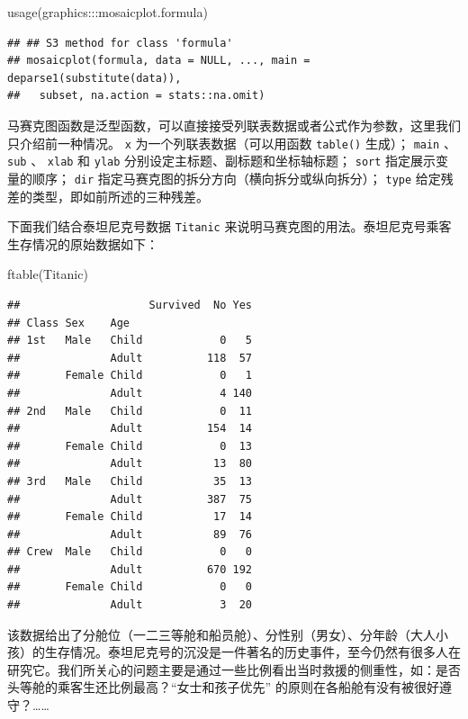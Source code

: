 \documentclass[
  b5paper,
  UTF8,twoside]{book}
\newenvironment{Shaded}{\begin{snugshade}}{\end{snugshade}}
\newcommand{\FunctionTok}[1]{\textcolor[rgb]{0.00,0.00,0.00}{#1}}
\newcommand{\NormalTok}[1]{#1}
\newcommand{\SpecialCharTok}[1]{\textcolor[rgb]{0.00,0.00,0.00}{#1}}
\begin{document}
\begin{Shaded}
\begin{Highlighting}[]
\FunctionTok{usage}\NormalTok{(graphics}\SpecialCharTok{:::}\NormalTok{mosaicplot.formula)}
\end{Highlighting}
\end{Shaded}

\begin{verbatim}
## ## S3 method for class 'formula'
## mosaicplot(formula, data = NULL, ..., main = deparse1(substitute(data)),
##   subset, na.action = stats::na.omit)
\end{verbatim}

马赛克图函数是泛型函数，可以直接接受列联表数据或者公式作为参数，这里我们只介绍前一种情况。 \texttt{x} 为一个列联表数据（可以用函数 \texttt{table()} 生成）； \texttt{main} 、 \texttt{sub} 、 \texttt{xlab} 和 \texttt{ylab} 分别设定主标题、副标题和坐标轴标题； \texttt{sort} 指定展示变量的顺序； \texttt{dir} 指定马赛克图的拆分方向（横向拆分或纵向拆分）； \texttt{type} 给定残差的类型，即如前所述的三种残差。

下面我们结合泰坦尼克号数据 \texttt{Titanic} 来说明马赛克图的用法。泰坦尼克号乘客生存情况的原始数据如下：

\begin{Shaded}
\begin{Highlighting}[]
\FunctionTok{ftable}\NormalTok{(Titanic)}
\end{Highlighting}
\end{Shaded}

\begin{verbatim}
##                    Survived  No Yes
## Class Sex    Age                   
## 1st   Male   Child            0   5
##              Adult          118  57
##       Female Child            0   1
##              Adult            4 140
## 2nd   Male   Child            0  11
##              Adult          154  14
##       Female Child            0  13
##              Adult           13  80
## 3rd   Male   Child           35  13
##              Adult          387  75
##       Female Child           17  14
##              Adult           89  76
## Crew  Male   Child            0   0
##              Adult          670 192
##       Female Child            0   0
##              Adult            3  20
\end{verbatim}

该数据给出了分舱位（一二三等舱和船员舱）、分性别（男女）、分年龄（大人小孩）的生存情况。泰坦尼克号的沉没是一件著名的历史事件，至今仍然有很多人在研究它。我们所关心的问题主要是通过一些比例看出当时救援的侧重性，如：是否头等舱的乘客生还比例最高？``女士和孩子优先'' 的原则在各船舱有没有被很好遵守？\ldots\ldots{}
\end{document}
